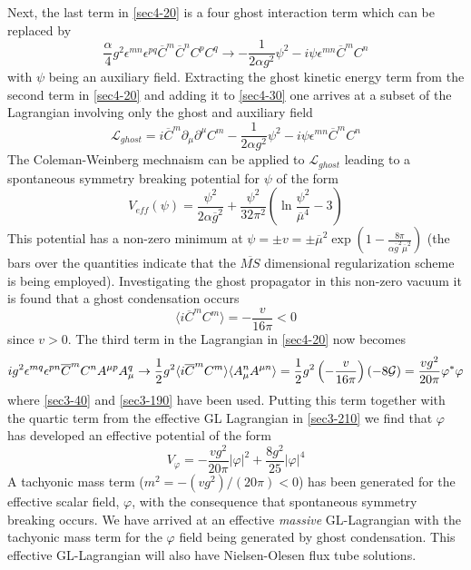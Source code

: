 \documentclass[a4paper,aps,showpacs]{revtex4}
\begin{document}
Next, the last term in \eqref{sec4-20} is a four ghost interaction term which can be replaced by
\cite{dudal} \cite{lemes}
\begin{equation}
\label{sec4-30}
\frac{\alpha}{4} g^2 \epsilon ^{mn} \epsilon ^{pq} {\overline{ C}}^m {\overline{ C}}^n C^p C^q
\rightarrow -\frac{1}{2 \alpha g^2} \psi ^2 - i \psi \epsilon ^{mn} {\overline{ C}}^m C^n
\end{equation}
with $\psi$ being an auxiliary field. Extracting the ghost kinetic energy term from the
second term in \eqref{sec4-20} and adding it to \eqref{sec4-30} one arrives at a
subset of the Lagrangian involving only the ghost and auxiliary field
\begin{equation}
\label{sec4-40}
{\mathcal L}_{ghost} = i {\overline{ C}}^m \partial _{\mu} \partial ^{\mu} C^m
-\frac{1}{2 \alpha g^2} \psi ^2 - i \psi \epsilon ^{mn} {\overline{ C}}^m C^n
\end{equation}
The Coleman-Weinberg mechnaism \cite{coleman} can be applied to 
${\mathcal L}_{ghost}$ leading to a spontaneous symmetry breaking
potential for $\psi$ of the form
\begin{equation}
\label{sec4-50}
V_{eff} (\psi ) = \frac{\psi ^2}{2 \alpha {\overline g}^2} + \frac{\psi ^2}{32 \pi ^2}
\left( \ln \frac{\psi ^2}{{\overline \mu} ^4} -3 \right)
\end{equation}
This potential has a non-zero minimum at $\psi = \pm v = \pm {\overline \mu}^2 \exp \left(1 - 
\frac{8 \pi}{\alpha {\overline g}^2 {\overline \mu}^2} \right)$ (the bars over the quantities
indicate that the $\overline{MS}$ dimensional regularization scheme is being employed).
Investigating the ghost propagator in this non-zero vacuum it is found \cite{dudal} 
that a ghost condensation occurs
\begin{equation}
\label{sec4-60}
\langle i {\overline{ C}} ^m C^m \rangle = -\frac{v}{16 \pi} <0
\end{equation}
since $v>0$. The third term in the Lagrangian in \eqref{sec4-20} now becomes
\begin{equation}
\label{sec4-70}
ig^2 \epsilon ^{mq} \epsilon^{pn} {\overline{ C}}^m C^n A^{\mu p}A_{\mu} ^q
\rightarrow
\frac{1}{2} g^2 \langle i {\overline{ C}} ^m C^m \rangle \langle A_{\mu} ^n A^{\mu n} \rangle
=
\frac{1}{2} g^2 \left( - \frac{v}{16 \pi} \right) \left( -8 {\cal G} \right)
=
\frac{v g^2}{20 \pi} \varphi ^* \varphi
\end{equation}
where \eqref{sec3-40}  and \eqref{sec3-190} have been used.
Putting this term together with the quartic term from the effective GL Lagrangian in
\eqref{sec3-210} we find that $\varphi$ has developed an effective potential
of the form
\begin{equation}
\label{sec4-80}
V_{\varphi} = -\frac{v g^2}{20 \pi} | \varphi |^2 + \frac{8 g^2}{25} |\varphi |^4
\end{equation}
A tachyonic mass term ($m^2 = -(v g^2)/(20 \pi) <0$)  has been generated 
for the effective scalar field, $\varphi$, with the consequence that spontaneous
symmetry breaking occurs. We have arrived at an effective
{\it massive} GL-Lagrangian with the tachyonic mass term for the $\varphi$
field  being generated by ghost condensation. This effective GL-Lagrangian will 
also have Nielsen-Olesen flux tube solutions.
\end{document}
